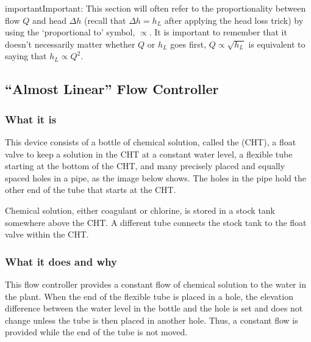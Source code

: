 \documentclass[letterpaper,10pt,english]{sphinxmanual}
\begin{document}
\begin{sphinxadmonition}{important}{Important:}
This section will often refer to the proportionality between flow \(Q\) and head \(\Delta h\) (recall that \(\Delta h = h_L\) after applying the head loss trick) by using the ‘proportional to’ symbol, \(\propto\). It is important to remember that it doesn’t necessarily matter whether \(Q\) or \(h_L\) goes first, \(Q \propto \sqrt{h_L}\) is equivalent to saying that \(h_L \propto Q^2\).
\end{sphinxadmonition}


\subsection{“Almost Linear” Flow Controller}
\label{\detokenize{Flow_Control_and_Measurement/FCM_Design:almost-linear-flow-controller}}\label{\detokenize{Flow_Control_and_Measurement/FCM_Design:heading-almost-linear-flow-controller}}

\subsubsection{What it is}
\label{\detokenize{Flow_Control_and_Measurement/FCM_Design:what-it-is}}
This device consists of a bottle of chemical solution, called the  (CHT), a float valve to keep a solution in the CHT at a constant water level, a flexible tube starting at the bottom of the CHT, and many precisely placed and equally spaced holes in a pipe, as the image below shows. The holes in the pipe hold the other end of the tube that starts at the CHT.

Chemical solution, either coagulant or chlorine, is stored in a stock tank somewhere above the CHT. A different tube connects the stock tank to the float valve within the CHT.


\subsubsection{What it does and why}
\label{\detokenize{Flow_Control_and_Measurement/FCM_Design:what-it-does-and-why}}
This flow controller provides a constant flow of chemical solution to the water in the plant. When the end of the flexible tube is placed in a hole, the elevation difference between the water level in the bottle and the hole is set and does not change unless the tube is then placed in another hole. Thus, a constant flow is provided while the end of the tube is not moved.
\end{document}
